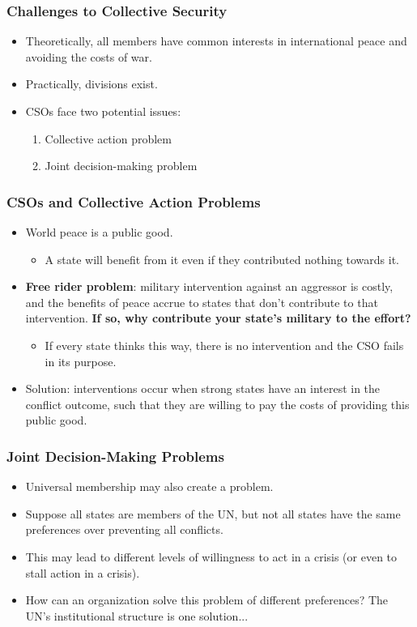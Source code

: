 \documentclass{beamer}
\begin{document}
\begin{frame} 
	\frametitle{\LARGE{Challenges to Collective Security}}
		\begin{itemize}
			\item Theoretically, all members have common interests in international peace and avoiding the costs of war. \pause
			\item Practically, divisions exist. \pause 
			\item CSOs face two potential issues: \pause
			\begin{enumerate}
				\item Collective action problem
				\item Joint decision-making problem
			\end{enumerate}
		\end{itemize}
\end{frame}

\begin{frame} 
	\frametitle{\LARGE{CSOs and Collective Action Problems}}
	\begin{itemize}
		\item World peace is a public good. \pause
		\begin{itemize}
			\item A state will benefit from it even if they contributed nothing towards it. \pause
		\end{itemize}
	\item \textbf{Free rider problem}: military intervention against an aggressor is costly, and the benefits of peace accrue to states that don't contribute to that intervention. \textbf{If so, why contribute your state's military to the effort?} \pause
		\begin{itemize}
		\item If every state thinks this way, there is no intervention and the CSO fails in its purpose.
		\end{itemize}
	\item Solution: interventions occur when strong states have an interest in the conflict outcome, such that they are willing to pay the costs of providing this public good. 
	\end{itemize}
\end{frame}

\begin{frame} 
	\frametitle{\LARGE{Joint Decision-Making Problems}}
	\begin{itemize}
		\item Universal membership may also create a problem. \pause
		\item Suppose all states are members of the UN, but not all states have the same preferences over preventing all conflicts.	\pause	
		\item This may lead to different levels of willingness to act in a crisis (or even to stall action in a crisis). \pause
		\item How can an organization solve this problem of different preferences? The UN's institutional structure is one solution...
	\end{itemize}
\end{frame}
\end{document}

